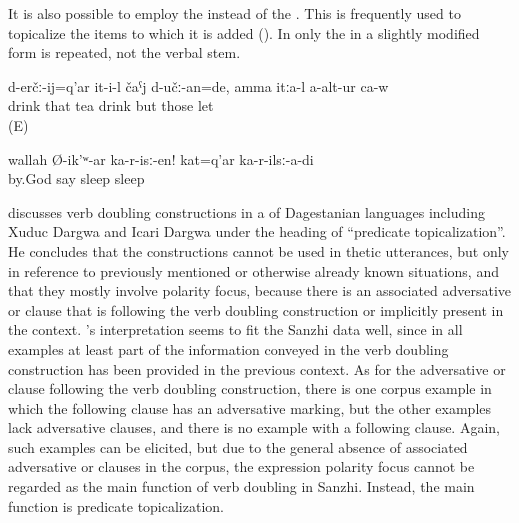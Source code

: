 It is also possible to employ the   instead of the . This  is frequently used to topicalize the items to which it is added (). In  only the  in a slightly modified form is repeated, not the verbal stem.
%
\begin{exe}
	\ex	\label{ex:‎As for drinking, he would have drunk the tea, but they did not let him}
	\gll	d-erčː-ij=q'ar	it-i-l	čaˁj	d-učː-an=de,	amma	itːa-l	a-alt-ur	ca-w\\
		drink	that	tea	drink	but	those	let	\\
	\glt	{} (E)
	
		\ex	\label{ex:By God, he says, lay down (in the hospital)}
	\gll	wallah	Ø-ik'ʷ-ar		ka-r-isː-en!	kat=q'ar	ka-r-ilsː-a-di\\
		by.God	say		sleep 	sleep\\
	\glt	{}
	
\end{exe}

\citet{Maisak2010} discusses verb doubling constructions in a  of Dagestanian languages including Xuduc Dargwa and Icari Dargwa under the heading of ``predicate topicalization''. He concludes that the constructions cannot be used in thetic utterances, but only in reference to previously mentioned or otherwise already known situations, and that they mostly involve polarity focus, because there is an associated adversative or  clause that is following the verb doubling construction or implicitly present in the context. 's interpretation seems to fit the Sanzhi data well, since in all examples at least part of the information conveyed in the verb doubling construction has been provided in the previous context. As for the adversative or  clause following the verb doubling construction, there is one corpus example in which the following clause has an adversative  marking, but the other examples  lack adversative clauses, and there is no example with a following  clause. Again, such examples can be elicited, but due to the general absence of associated adversative or  clauses in the corpus, the expression polarity focus cannot be regarded as the main function of verb doubling in Sanzhi. Instead, the main function is predicate topicalization.



